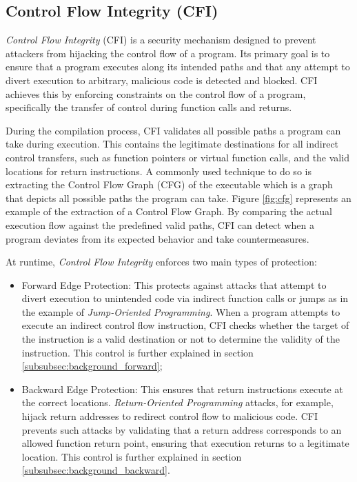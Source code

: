 \subsection{Control Flow Integrity (CFI)}
\label{subsec:background_cfi}

\textit{Control Flow Integrity} (CFI) is a security mechanism designed to prevent
attackers from hijacking the control flow of a program. Its primary goal is to
ensure that a program executes along its intended paths and that any attempt to
divert execution to arbitrary, malicious code is detected and blocked. CFI
achieves this by enforcing constraints on the control flow of a program, specifically
the transfer of control during function calls and returns.

During the compilation process, CFI validates all possible paths a program can
take during execution. This contains the legitimate destinations for all indirect
control transfers, such as function pointers or virtual function calls, and the valid
locations for return instructions. A commonly used technique to do so is
extracting the Control Flow Graph (CFG) of the executable which is a graph that
depicts all possible paths the program can take. Figure \ref{fig:cfg} represents
an example of the extraction of a Control Flow Graph. By comparing the actual
execution flow against the predefined valid paths, CFI can detect when a program
deviates from its expected behavior and take countermeasures.

At runtime, \textit{Control Flow Integrity} enforces two main types of protection:
\begin{itemize}
  \item Forward Edge Protection: This protects against attacks that attempt to
    divert execution to unintended code via indirect function calls or jumps as
    in the example of \textit{Jump-Oriented Programming}. When a program
    attempts to execute an indirect control flow instruction, CFI checks whether
    the target of the instruction is a valid destination or not to determine the
    validity of the instruction. This control is further explained in section
    \ref{subsubsec:background_forward};

  \item Backward Edge Protection: This ensures that return instructions execute
    at the correct locations. \textit{Return-Oriented Programming} attacks, for example,
    hijack return addresses to redirect control flow to malicious code. CFI prevents
    such attacks by validating that a return address corresponds to an allowed function
    return point, ensuring that execution returns to a legitimate location. This
    control is further explained in section \ref{subsubsec:background_backward}.
\end{itemize}

